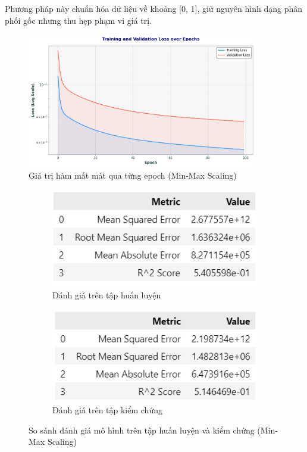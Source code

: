 Phương pháp này chuẩn hóa dữ liệu về khoảng [0, 1], giữ nguyên hình dạng phân phối gốc nhưng thu hẹp phạm vi giá trị.

\begin{figure}[H]
    \centering
    \includegraphics[width=0.9\textwidth]{img_multiple/loss_min_max.png} %
    \caption{Giá trị hàm mất mát qua từng epoch (Min-Max Scaling)}
    \label{fig:loss_min_max}
\end{figure}

\begin{figure}[H]
    \centering
    \begin{subfigure}[b]{0.48\textwidth}
        \centering
        \includegraphics[width=\linewidth]{img_multiple/metrics_min_max_train.png}
        \caption{Đánh giá trên tập huấn luyện}
    \end{subfigure}
    \hfill
    \begin{subfigure}[b]{0.48\textwidth}
        \centering
        \includegraphics[width=\linewidth]{img_multiple/metrics_min_max_val.png}
        \caption{Đánh giá trên tập kiểm chứng}
    \end{subfigure}
    \caption{So sánh đánh giá mô hình trên tập huấn luyện và kiểm chứng (Min-Max Scaling)} 
\end{figure}

